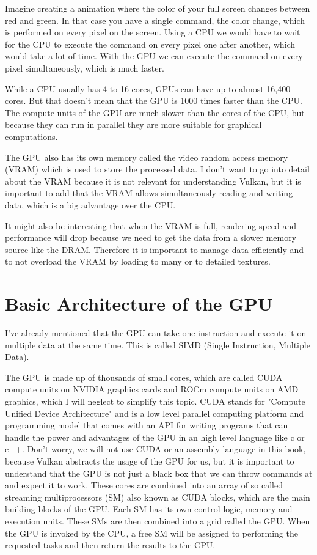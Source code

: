 \documentclass[12pt]{report} \usepackage{preamble}
\begin{document}
Imagine creating a animation where the color of your full screen changes
between red and green. In that case you have a single command, the color
change, which is performed on every pixel on the screen. Using a CPU
we would have to wait for the CPU to execute the command on every pixel
one after another, which would take a lot of time. With the GPU we can
execute the command on every pixel simultaneously, which is much faster.

While a CPU usually has 4 to 16 cores, GPUs can have up to almost 16,400
cores. \cite{NVIDIA-rtx-4090} But that doesn't mean that the GPU is 1000
times faster than the CPU. The compute units of the GPU are much slower
than the cores of the CPU, but because they can run in parallel they are
more suitable for graphical computations. \cite{CUDA_Programming_Guide}

The GPU also has its own memory called the video random access memory
(VRAM) which is used to store the processed data. I don't want to go into
detail about the VRAM because it is not relevant for understanding Vulkan,
but it is important to add that the VRAM allows simultaneously reading
and writing data, which is a big advantage over the CPU. \cite{vram}

It might also be interesting that when the VRAM is full, rendering
speed and performance will drop because we need to get the data from a
slower memory source like the DRAM.  Therefore it is important to manage
data efficiently and to not overload the VRAM by loading to many or to
detailed textures.

\section{Basic Architecture of the GPU}

I've already mentioned that the GPU can take one instruction and
execute it on multiple data at the same time. This is called SIMD
(Single Instruction, Multiple Data). \cite{cherry_gpu_architecture}

The GPU is made up of thousands of small cores, which are called CUDA
compute units on NVIDIA graphics cards \cite{CUDA_Programming_Guide}
and ROCm compute units on AMD graphics, which I will neglect to
simplify this topic. \cite{rocm} CUDA stands for "Compute Unified
Device Architecture" and is a low level parallel computing platform
and programming model that comes with an API for writing programs
that can handle the power and advantages of the GPU in an high level
language like c or c++. \cite{CUDA_Programming_Guide} Don't worry, we
will not use CUDA or an assembly language in this book, because Vulkan
abstracts the usage of the GPU for us, but it is important to understand
that the GPU is not just a black box that we can throw commands at and
expect it to work. These cores are combined into an array of so called
streaming multiprocessors (SM) also known as CUDA blocks, which are the
main building blocks of the GPU.  Each SM has its own control logic,
memory and execution units. \cite{CUDA_Programming_Guide} These SMs are
then combined into a grid called the GPU.  When the GPU is invoked by
the CPU, a free SM will be assigned to performing the requested tasks
and then return the results to the CPU. \cite{CUDA_Programming_Guide}
\end{document}
